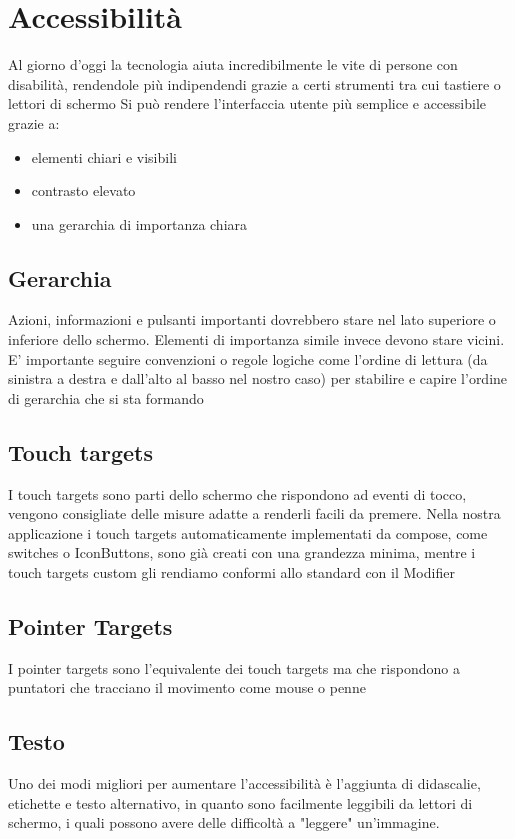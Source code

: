 \documentclass[12pt, a4paper]{report}
\begin{document}
	\section{Accessibilità}
		Al giorno d'oggi la tecnologia aiuta incredibilmente le vite di persone con disabilità, rendendole più indipendendi grazie a certi strumenti tra cui tastiere o lettori di schermo
		Si può rendere l'interfaccia utente più semplice e accessibile grazie a:
		\begin{itemize}
			\item elementi chiari e visibili
			\item contrasto elevato
			\item una gerarchia di importanza chiara
		\end{itemize}
		\subsection{Gerarchia}
			Azioni, informazioni e pulsanti importanti dovrebbero stare nel lato superiore o inferiore dello schermo.
			Elementi di importanza simile invece devono stare vicini. E' importante seguire convenzioni o regole logiche come l'ordine di lettura (da sinistra a destra e dall'alto al basso nel nostro caso) per stabilire e capire l'ordine di gerarchia che si sta formando
		\subsection{Touch targets}
			I touch targets sono parti dello schermo che rispondono ad eventi di tocco, vengono consigliate delle misure adatte a renderli facili da premere. Nella nostra applicazione i touch targets automaticamente implementati da compose, come switches o IconButtons, sono già creati con una grandezza minima,
			mentre i touch targets custom gli rendiamo conformi allo standard con il Modifier
		\subsection{Pointer Targets}
			I pointer targets sono l'equivalente dei touch targets ma che rispondono a puntatori che tracciano il movimento come mouse o penne
		\subsection{Testo}
			Uno dei modi migliori per aumentare l'accessibilità è l'aggiunta di didascalie, etichette e testo alternativo, in quanto sono facilmente leggibili da lettori di schermo, i quali possono avere delle difficoltà a "leggere" un'immagine.
			
\end{document}
